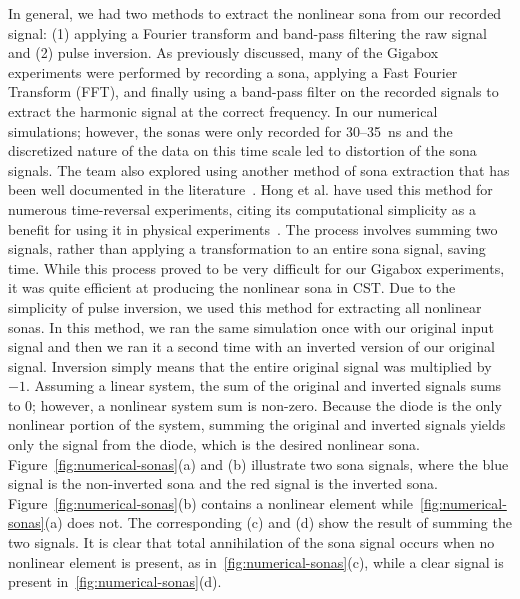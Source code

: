 In general, we had two methods to extract the nonlinear sona from our recorded signal: (1) applying a Fourier transform and band-pass filtering the raw signal and (2) pulse inversion. As previously discussed, many of the Gigabox experiments were performed by recording a sona, applying a Fast Fourier Transform (FFT), and finally using a band-pass filter on the recorded signals to extract the harmonic signal at the correct frequency. In our numerical simulations; however, the sonas were only recorded for \numrange{30}{35}~ns and the discretized nature of the data on this time scale led to distortion of the sona signals. The team also explored using another method of sona extraction that has been well documented in the literature~\cite{simpson_pulse_1999,hong_nonlinear_2014}. Hong et al. have used this method for numerous time-reversal experiments, citing its computational simplicity as a benefit for using it in physical experiments~\cite{hong_nonlinear_2014}. The process involves summing two signals, rather than applying a transformation to an entire sona signal, saving time. While this process proved to be very difficult for our Gigabox experiments, it was quite efficient at producing the nonlinear sona in CST.
Due to the simplicity of pulse inversion, we used this method for extracting all nonlinear sonas. In this method, we ran the same simulation once with our original input signal and then we ran it a second time with an inverted version of our original signal. Inversion simply means that the entire original signal was multiplied by $-1$. Assuming a linear system, the sum of the original and inverted signals sums to $0$; however, a nonlinear system sum is non-zero. Because the diode is the only nonlinear portion of the system, summing the original and inverted signals yields only the signal from the diode, which is the desired nonlinear sona. Figure~\ref{fig:numerical-sonas}(a) and (b) illustrate two sona signals, where the blue signal is the non-inverted sona and the red signal is the inverted sona. Figure~\ref{fig:numerical-sonas}(b) contains a nonlinear element while~\ref{fig:numerical-sonas}(a) does not. The corresponding (c) and (d) show the result of summing the two signals. It is clear that total annihilation of the sona signal occurs when no nonlinear element is present, as in~\ref{fig:numerical-sonas}(c), while a clear signal is present in~\ref{fig:numerical-sonas}(d).


